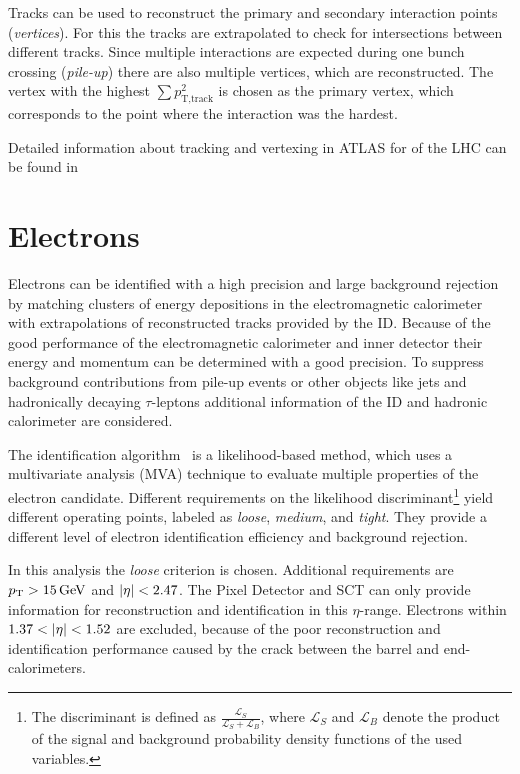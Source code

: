 Tracks can be used to reconstruct the primary and secondary interaction points (\emph{vertices}).
For this the tracks are extrapolated to check for intersections between different tracks.
Since multiple interactions are expected during one bunch crossing (\emph{pile-up}) there are also multiple vertices, which
are reconstructed.
The vertex with the highest $\sum p_{\text{T},\text{track}}^2$ is chosen as the primary vertex, which corresponds to the
point where the interaction was the hardest.

Detailed information about tracking and vertexing in ATLAS for \runtwo{} of the LHC
can be found in~\cite{ATL-PHYS-PUB-2015-051,ATL-PHYS-PUB-2015-006,ATL-PHYS-PUB-2015-026}


\section{Electrons}\label{sec:object_selection:electrons}

Electrons can be identified with a high precision and large background rejection by matching clusters of energy
depositions in the electromagnetic calorimeter with extrapolations of reconstructed tracks provided by the ID\@.
Because of the good performance of the electromagnetic calorimeter and inner detector their energy and momentum can
be determined with a good precision.
To suppress background contributions from pile-up events or other objects like jets and hadronically decaying $\tau$-leptons
additional information of the ID and hadronic calorimeter are considered.

The identification algorithm~\cite{ATLAS-CONF-2016-024} is a likelihood-based method, which uses a multivariate analysis (MVA) technique to
evaluate multiple properties of the electron candidate.
Different requirements on the likelihood discriminant\footnote{The discriminant is defined as
$\frac{\mathcal{L}_S}{\mathcal{L}_S + \mathcal{L}_B}$, where $\mathcal{L}_S$ and $\mathcal{L}_B$ denote the product of
the signal and background probability density functions of the used variables.} yield different operating points,
labeled as  \emph{loose}, \emph{medium}, and \emph{tight}.
They provide a different level of electron identification efficiency and background rejection.

In this analysis the \emph{loose} criterion is chosen.
Additional requirements are $\pt > \unit[15]{GeV}$ and $\left|\eta\right| < 2.47$.
The Pixel Detector and SCT can only provide information for reconstruction and identification in this $\eta$-range.
Electrons within $1.37 < \left|\eta\right| < 1.52$ are excluded, because of the poor reconstruction and identification
performance caused by the crack between the barrel and end-calorimeters.

